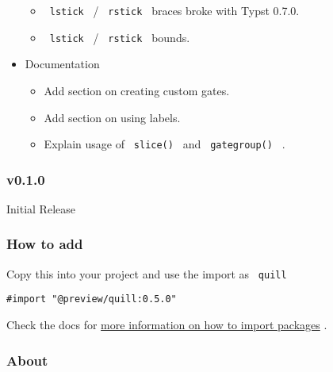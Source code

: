 \begin{itemize}
  \begin{itemize}
  \tightlist
  \item
    \texttt{\ lstick\ } / \texttt{\ rstick\ } braces broke with Typst
    0.7.0.
  \item
    \texttt{\ lstick\ } / \texttt{\ rstick\ } bounds.
  \end{itemize}
\item
  Documentation

  \begin{itemize}
  \tightlist
  \item
    Add section on creating custom gates.
  \item
    Add section on using labels.
  \item
    Explain usage of \texttt{\ slice()\ } and \texttt{\ gategroup()\ } .
  \end{itemize}
\end{itemize}

\subsubsection{v0.1.0}\label{v0.1.0}

Initial Release

\subsubsection{How to add}\label{how-to-add}

Copy this into your project and use the import as \texttt{\ quill\ }

\begin{verbatim}
#import "@preview/quill:0.5.0"
\end{verbatim}



Check the docs for
\href{https://typst.app/docs/reference/scripting/\#packages}{more
information on how to import packages} .

\subsubsection{About}\label{about}

